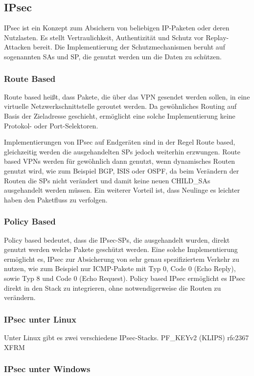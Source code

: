 \subsection{IPsec}
\ac{IPsec} ist ein Konzept zum Absichern von beliebigen \ac{IP}-Paketen oder deren Nutzlasten.
Es stellt Vertraulichkeit, Authentizität und Schutz vor Replay-Attacken bereit.
Die Implementierung der Schutzmechanismen beruht auf sogenannten \acp{SA} und \ac{SP},
die genutzt werden um die Daten zu schützen.
\subsubsection{Route Based}
Route based heißt, dass Pakete, die über das VPN
gesendet werden sollen, in eine virtuelle Netzwerkschnittstelle geroutet werden.
Da gewöhnliches Routing auf Basis der Zieladresse geschieht, ermöglicht eine solche Implementierung
keine Protokol- oder Port-Selektoren.

Implementierungen von IPsec auf Endgeräten sind in der Regel Route based, gleichzeitig werden
die ausgehandelten \acp{SP} jedoch weiterhin erzwungen.
Route based \acp{VPN} werden für gewöhnlich dann genutzt, wenn dynamisches Routen genutzt wird,
wie zum Beispiel \ac{BGP}, \ac{ISIS} oder \ac{OSPF}, da beim Verändern der Routen die \acp{SP} nicht verändert
und damit keine neuen CHILD\_SAs ausgehandelt werden müssen. Ein weiterer Vorteil ist, dass Neulinge es leichter haben
den Paketfluss zu verfolgen.
\subsubsection{Policy Based}
Policy based bedeutet, dass die \ac{IPsec}-\acp{SP}, die ausgehandelt wurden, direkt genutzt werden welche Pakete geschützt werden.
Eine solche Implementierung ermöglicht es, \ac{IPsec} zur Absicherung von sehr genau spezifiziertem
Verkehr zu nutzen, wie zum Beispiel nur \ac{ICMP}-Pakete mit Typ 0, Code 0 (Echo Reply), sowie Typ 8 und Code 0 (Echo Request).
Policy based \ac{IPsec} ermöglicht es \ac{IPsec} direkt in den Stack zu integrieren, ohne notwendigerweise die Routen zu verändern.
\subsubsection{IPsec unter Linux}
Unter Linux gibt es zwei verschiedene \ac{IPsec}-Stacks. 
PF\_KEYv2 (KLIPS) rfc2367
XFRM
\subsubsection{IPsec unter Windows}
